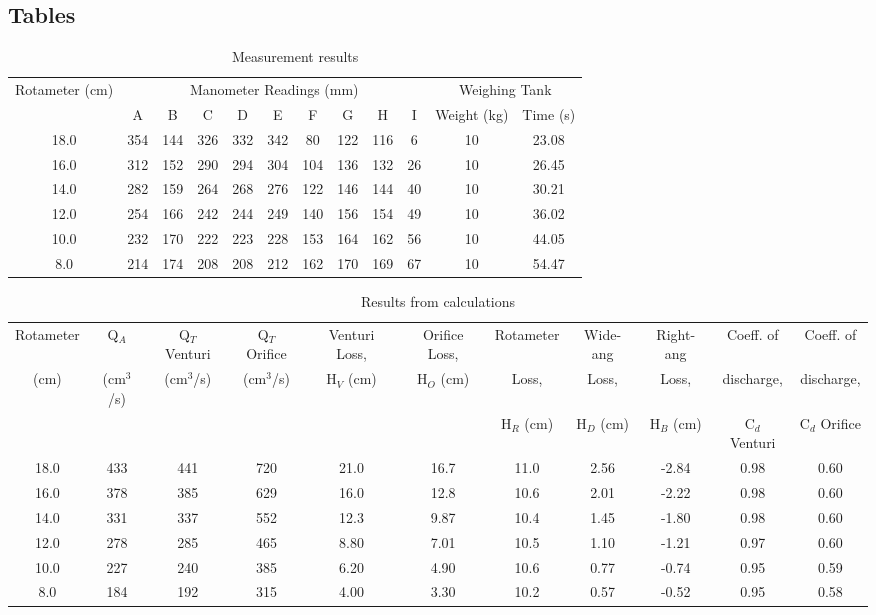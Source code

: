 \documentclass[a4paper]{article}
\begin{document}
\begin{landscape}
\subsection{Tables}
\begin{table}[htbp]
\begin{center}
\begin{tabular}{cccccccccccc} \toprule
\multicolumn{1}{c}{Rotameter (cm)} & \multicolumn{9}{c}{Manometer Readings (mm)} & \multicolumn{2}{c}{Weighing Tank} \\ \cmidrule(r){2-10} \cmidrule(l){11-12}
\multicolumn{1}{c}{} & A & B & C & D & E & F & G & H & I & Weight (kg) & Time (s) \\ \midrule
18.0 & 354 & 144 & 326 & 332 & 342 & 80 & 122 & 116 & 6 & 10 & 23.08 \\ 
16.0 & 312 & 152 & 290 & 294 & 304 & 104 & 136 & 132 & 26 & 10 & 26.45 \\ 
14.0 & 282 & 159 & 264 & 268 & 276 & 122 & 146 & 144 & 40 & 10 & 30.21 \\ 
12.0 & 254 & 166 & 242 & 244 & 249 & 140 & 156 & 154 & 49 & 10 & 36.02 \\ 
10.0 & 232 & 170 & 222 & 223 & 228 & 153 & 164 & 162 & 56 & 10 & 44.05 \\ 
8.0 & 214 & 174 & 208 & 208 & 212 & 162 & 170 & 169 & 67 & 10 & 54.47 \\ \bottomrule
\end{tabular}
\end{center}
\caption{Measurement results}
\end{table}

\begin{table}[htbp]
\begin{center}
\begin{tabular}{ccccccccccc} \toprule
Rotameter & Q$_A$ & Q$_T$ Venturi & Q$_T$ Orifice & Venturi Loss, & Orifice Loss, & Rotameter & Wide-ang & Right-ang & Coeff. of & Coeff. of \\ 
 (cm) & (cm$^3$/s) & (cm$^3$/s) & (cm$^3$/s) & H$_V$ (cm) & H$_O$ (cm) & Loss, & Loss,  & Loss,  & discharge, & discharge, \\ 
 &  &  &  &  &  &  H$_R$ (cm) & H$_D$ (cm) & H$_B$ (cm) & C$_d$ Venturi & C$_d$ Orifice \\ \midrule
18.0 & 433 & 441 & 720 & 21.0 & 16.7 & 11.0 & 2.56 & -2.84 & 0.98 & 0.60 \\ 
16.0 & 378 & 385 & 629 & 16.0 & 12.8 & 10.6 & 2.01 & -2.22 & 0.98 & 0.60 \\ 
14.0 & 331 & 337 & 552 & 12.3 & 9.87 & 10.4 & 1.45 & -1.80 & 0.98 & 0.60 \\ 
12.0 & 278 & 285 & 465 & 8.80 & 7.01 & 10.5 & 1.10 & -1.21 & 0.97 & 0.60 \\ 
10.0 & 227 & 240 & 385 & 6.20 & 4.90 & 10.6 & 0.77 & -0.74 & 0.95 & 0.59 \\ 
8.0 & 184 & 192 & 315 & 4.00 & 3.30 & 10.2 & 0.57 & -0.52 & 0.95 & 0.58 \\ \bottomrule
\end{tabular}
\end{center}
\caption{Results from calculations}
\end{table}
\end{landscape}
\end{document}
